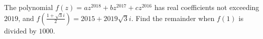 The polynomial $f(z)=az^{2018}+bz^{2017}+cz^{2016}$ has real coefficients not exceeding $2019$, and $f(\tfrac{1+\sqrt{3}i}{2})=2015+2019\sqrt{3}i$. Find the remainder when $f(1)$ is divided by $1000$.